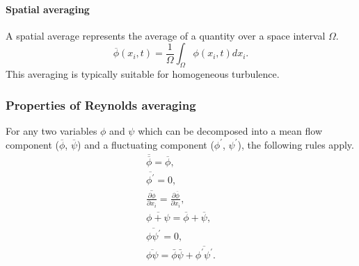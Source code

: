 \paragraph{Spatial averaging}
A spatial average represents the average of a quantity over a space interval $\Omega$.
\begin{equation}
\overline{\phi}(x_i,t) = \frac{1}{\Omega}\int_{\Omega} \phi(x_i,t) dx_i.
\end{equation}
This averaging is typically suitable for homogeneous turbulence.
\subsubsection{Properties of Reynolds averaging}
For any two variables $\phi$ and $\psi$ which can be decomposed into a mean flow component ($\overline{\phi}$, $\overline{\psi}$) and a fluctuating component ($\phi^{\prime}$, $\psi^{\prime}$), the following rules apply.
\begin{align}
\overline{\overline{\phi}} = \overline{\phi}, \nonumber\\
\overline{\phi^{\prime}} = 0, \nonumber\\
\overline{\frac{\partial \phi}{\partial x_i}} = \frac{\partial \overline{\phi}}{\partial x_i},\\
\overline{\phi + \psi} = \overline{\phi} + \overline{\psi},\nonumber\\
\overline{\phi \psi^{\prime}} = 0,\nonumber\\
\overline{\phi \psi} = \bar{\phi}\bar{\psi} + \overline{\phi^{\prime} \psi^{\prime}}. \nonumber
\end{align}
